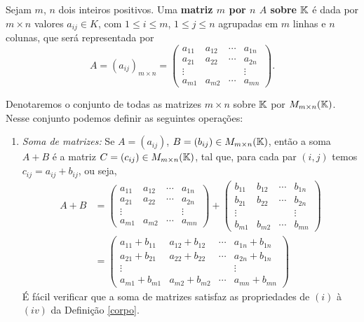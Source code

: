 Sejam $m$, $n$ dois inteiros positivos. Uma \textbf{matriz $m$ por $n$ $A$ sobre $\mathbb{K}$} \'e dada por $m \times n$ valores $a_{ij} \in K$, com $1 \le i \le m$, $1 \le j \le n$ agrupadas em $m$ linhas e $n$ colunas, que ser\'a representada por
\[
	A = (a_{ij})_{m\times n} = \begin{pmatrix}
		a_{11} & a_{12} & \cdots & a_{1n}\\
		a_{21} & a_{22} & \cdots & a_{2n}\\
		\vdots & & & \vdots\\
		a_{m1} & a_{m2} & \cdots & a_{mn}
	\end{pmatrix}.
\]

Denotaremos o conjunto de todas as matrizes $m \times n$ sobre $\mathbb{K}$ por $M_{m\times n}(\mathbb{K})$. Nesse conjunto podemos definir as seguintes opera\c{c}\~oes:
\begin{enumerate}
	\item \textit{Soma de matrizes:} Se $A = (a_{ij})$, $B = (b_{ij}) \in M_{m\times n}(\mathbb{K})$, ent\~ao a soma $A + B$ \'e a matriz $C = (c_{ij}) \in M_{m\times n}(\mathbb{K})$, tal que, para cada par $(i,j)$ temos $c_{ij} = a_{ij} + b_{ij}$, ou seja,
	\begin{align*}
		A + B &= \begin{pmatrix}
		a_{11} & a_{12} & \cdots & a_{1n}\\
		a_{21} & a_{22} & \cdots & a_{2n}\\
		\vdots & & & \vdots\\
		a_{m1} & a_{m2} & \cdots & a_{mn}
	\end{pmatrix} + \begin{pmatrix}
		b_{11} & b_{12} & \cdots & b_{1n}\\
		b_{21} & b_{22} & \cdots & b_{2n}\\
		\vdots & & & \vdots\\
		b_{m1} & b_{m2} & \cdots & b_{mn}
	\end{pmatrix}\\ &= \begin{pmatrix}
		a_{11} + b_{11} & a_{12} + b_{12} & \cdots & a_{1n} + b_{1n}\\
		a_{21} + b_{21} & a_{22} + b_{22}& \cdots & a_{2n} + b_{1n}\\
		\vdots & & & \vdots\\
		a_{m1} + b_{m1} & a_{m2} + b_{m2}& \cdots & a_{mn} + b_{mn}
	\end{pmatrix}
	\end{align*}
	\'E f\'acil verificar que a soma de matrizes satisfaz as propriedades de $(i)$ \`a $(iv)$ da Defini\c{c}\~ao \ref{corpo}.


\end{enumerate}
